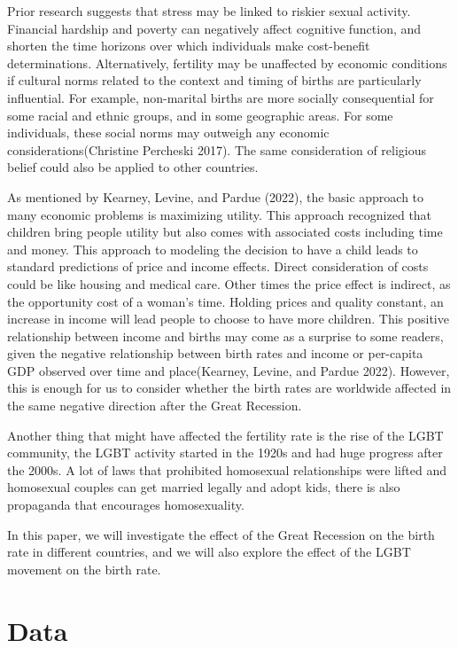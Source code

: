 \documentclass[
]{article}
\begin{document}
Prior research suggests that stress may be linked to riskier sexual activity. Financial hardship and poverty can negatively affect cognitive function, and shorten the time horizons over which individuals make cost-benefit determinations. Alternatively, fertility may be unaffected by economic conditions if cultural norms related to the context and timing of births are particularly influential. For example, non-marital births are more socially consequential for some racial and ethnic groups, and in some geographic areas. For some individuals, these social norms may outweigh any economic considerations(Christine Percheski 2017). The same consideration of religious belief could also be applied to other countries.

As mentioned by Kearney, Levine, and Pardue (2022), the basic approach to many economic problems is maximizing utility. This approach recognized that children bring people utility but also comes with associated costs including time and money. This approach to modeling the decision to have a child leads to standard predictions of price and income effects. Direct consideration of costs could be like housing and medical care. Other times the price effect is indirect, as the opportunity cost of a woman's time. Holding prices and quality constant, an increase in income will lead people to choose to have more children. This positive relationship between income and births may come as a surprise to some readers, given the negative relationship between birth rates and income or per-capita GDP observed over time and place(Kearney, Levine, and Pardue 2022). However, this is enough for us to consider whether the birth rates are worldwide affected in the same negative direction after the Great Recession.

Another thing that might have affected the fertility rate is the rise of the LGBT community, the LGBT activity started in the 1920s and had huge progress after the 2000s. A lot of laws that prohibited homosexual relationships were lifted and homosexual couples can get married legally and adopt kids, there is also propaganda that encourages homosexuality.

In this paper, we will investigate the effect of the Great Recession on the birth rate in different countries, and we will also explore the effect of the LGBT movement on the birth rate.

\hypertarget{data}{%
\section{Data}\label{data}}
\end{document}
